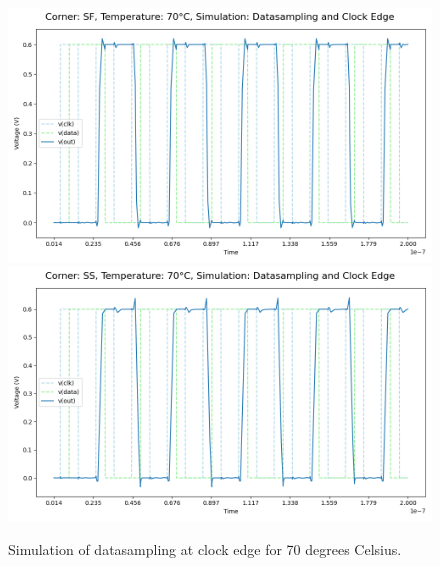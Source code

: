\begin{figure}[H]
    \vspace{5pt}
    \includegraphics[height= 0.21\textheight]{figures/aimspice/SF/70/W1.csv.png}
    \vspace{5pt}
    \includegraphics[height= 0.21\textheight]{figures/aimspice/SS/70/W1.csv.png}
    \caption{Simulation of datasampling at clock edge for 70 degrees Celsius.}
    \label{fig:aimspice_W1_70}
\end{figure}

\pagebreak

